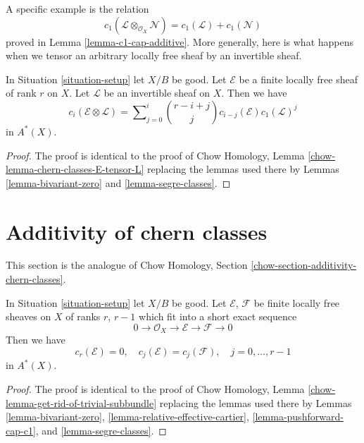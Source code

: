 \medskip\noindent
A specific example is the relation
$$
c_1(\mathcal{L} \otimes_{\mathcal{O}_X} \mathcal{N})
=
c_1(\mathcal{L}) + c_1(\mathcal{N})
$$
proved in Lemma \ref{lemma-c1-cap-additive}.
More generally, here is what happens when we tensor an
arbitrary locally free sheaf by an invertible sheaf.

\begin{lemma}
\label{lemma-chern-classes-E-tensor-L}
In Situation \ref{situation-setup} let $X/B$ be good.
Let $\mathcal{E}$ be a finite locally free sheaf of
rank $r$ on $X$. Let $\mathcal{L}$ be an invertible
sheaf on $X$. Then we have
\begin{equation}
\label{equation-twist}
c_i({\mathcal E} \otimes {\mathcal L})
=
\sum\nolimits_{j = 0}^i
\binom{r - i + j}{j} c_{i - j}({\mathcal E}) c_1({\mathcal L})^j
\end{equation}
in $A^*(X)$.
\end{lemma}

\begin{proof}
The proof is identical to the proof of
Chow Homology, Lemma \ref{chow-lemma-chern-classes-E-tensor-L}
replacing the lemmas used there by Lemmas \ref{lemma-bivariant-zero} and
\ref{lemma-segre-classes}.
\end{proof}












\section{Additivity of chern classes}
\label{section-additivity-chern-classes}

\noindent
This section is the analogue of Chow Homology, Section
\ref{chow-section-additivity-chern-classes}.

\begin{lemma}
\label{lemma-get-rid-of-trivial-subbundle}
In Situation \ref{situation-setup} let $X/B$ be good.
Let $\mathcal{E}$, $\mathcal{F}$ be finite locally free sheaves
on $X$ of ranks $r$, $r - 1$ which fit into a short
exact sequence
$$
0 \to \mathcal{O}_X \to \mathcal{E} \to \mathcal{F} \to 0
$$
Then we have
$$
c_r(\mathcal{E}) = 0, \quad
c_j(\mathcal{E}) = c_j(\mathcal{F}), \quad j = 0, \ldots, r - 1
$$
in $A^*(X)$.
\end{lemma}

\begin{proof}
The proof is identical to the proof of
Chow Homology, Lemma \ref{chow-lemma-get-rid-of-trivial-subbundle}
replacing the lemmas used there by
Lemmas \ref{lemma-bivariant-zero},
\ref{lemma-relative-effective-cartier},
\ref{lemma-pushforward-cap-c1}, and
\ref{lemma-segre-classes}.
\end{proof}

